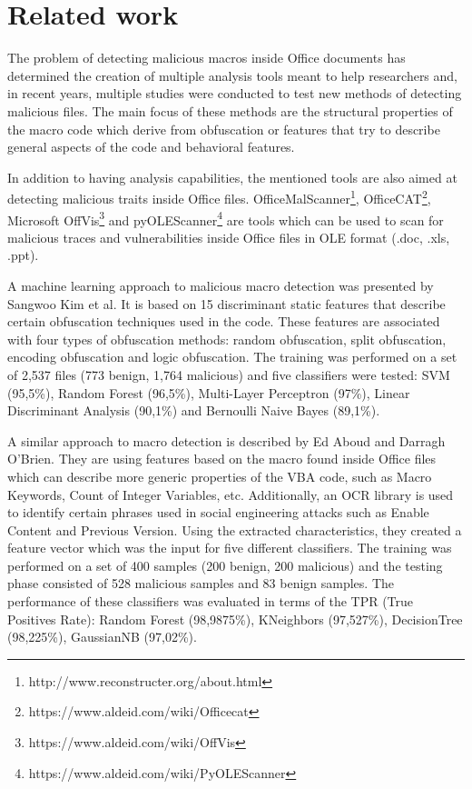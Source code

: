 \section{Related work}
The problem of detecting malicious macros inside Office documents has determined the creation of multiple analysis tools meant to help researchers and, in recent years, multiple studies were conducted to test new methods of detecting malicious files. The main focus of these methods are the structural properties of the macro code which derive from obfuscation or features that try to describe general aspects of the code and behavioral features. 
\par
In addition to having analysis capabilities, the mentioned tools are also aimed at detecting malicious traits inside Office files. OfficeMalScanner\footnote{http://www.reconstructer.org/about.html},  OfficeCAT\footnote{https://www.aldeid.com/wiki/Officecat}, Microsoft OffVis\footnote{https://www.aldeid.com/wiki/OffVis} and pyOLEScanner\footnote{https://www.aldeid.com/wiki/PyOLEScanner} are tools which can be used to scan for malicious traces and vulnerabilities inside Office files in OLE format (.doc, .xls, .ppt). 
\par
A machine learning approach to malicious macro detection was presented by Sangwoo Kim et al.\cite{KimHOL18} It is based on 15 discriminant static features that describe certain obfuscation techniques used in the code. These features are associated with four types of obfuscation methods: random obfuscation, split obfuscation, encoding obfuscation and logic obfuscation. The training was performed on a set of 2,537 files (773 benign, 1,764 malicious) and five classifiers were tested: SVM (95,5\%), Random Forest (96,5\%), Multi-Layer Perceptron (97\%), Linear Discriminant Analysis (90,1\%) and Bernoulli Naive Bayes (89,1\%). 
\par
A similar approach to macro detection is described by Ed Aboud and Darragh O'Brien\cite{AboudO18}. They are using features based on the macro found inside Office files which can describe more generic properties of the VBA code, such as Macro Keywords, Count of Integer Variables, etc. Additionally, an OCR library is used to identify certain phrases used in social engineering attacks such as Enable Content and Previous Version. Using the extracted characteristics, they created a feature vector which was the input for five different classifiers. The training was performed on a set of 400 samples (200 benign, 200 malicious) and the testing phase consisted of 528 malicious samples and 83 benign samples. The performance of these classifiers was evaluated in terms of the TPR (True Positives Rate): Random Forest (98,9875\%), KNeighbors (97,527\%), DecisionTree (98,225\%), GaussianNB (97,02\%).
